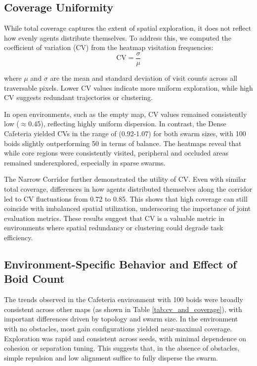 \documentclass[12pt]{article}
\begin{document}
\subsection{Coverage Uniformity}

While total coverage captures the extent of spatial exploration, it does not reflect how evenly agents distribute themselves. To address this, we computed the coefficient of variation (CV) from the heatmap visitation frequencies:
\[\text{CV} = \frac{\sigma}{\mu}\]

where \(\mu\) and \(\sigma\) are the mean and standard deviation of visit counts across all traversable pixels. Lower CV values indicate more uniform exploration, while high CV suggests redundant trajectories or clustering. 

In open environments, such as the empty map, CV values remained consistently low (\(\approx\)0.45), reflecting highly uniform dispersion. In contrast, the Dense Cafeteria yielded CVs in the range of (0.92-1.07) for both swarm sizes, with 100 boids slightly outperforming 50 in terms of balance. The heatmaps reveal that while core regions were consistently visited, peripheral and occluded areas remained underexplored, especially in sparse swarms.

The Narrow Corridor further demonstrated the utility of CV. Even with similar total coverage, differences in how agents distributed themselves along the corridor led to CV fluctuations from 0.72 to 0.85. This shows that high coverage can still coincide with imbalanced spatial utilization, underscoring the importance of joint evaluation metrics. These results suggest that CV is a valuable metric in environments where spatial redundancy or clustering could degrade task efficiency.

\subsection{Environment-Specific Behavior and Effect of Boid Count}

The trends observed in the Cafeteria environment with 100 boids were broadly consistent across other maps (as shown in Table \ref{tab:cv_and_coverage}), with important differences driven by topology and swarm size. In the environment with no obstacles, most gain configurations yielded near-maximal coverage. Exploration was rapid and consistent across seeds, with minimal dependence on cohesion or separation tuning. This suggests that, in the absence of obstacles, simple repulsion and low alignment suffice to fully disperse the swarm.
\end{document}
